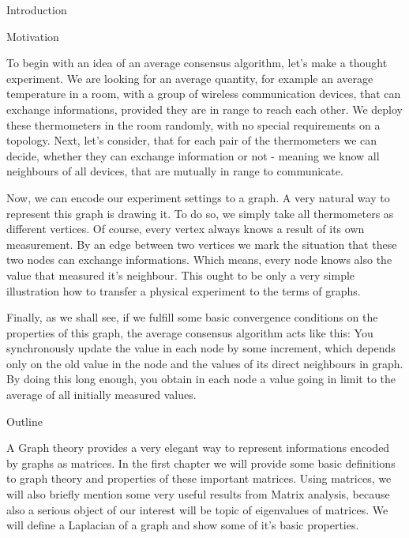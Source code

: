 

\def\ctustyle{{\tenss CTUstyle}}
\def\ttb{\tt\char`\\} %

\chap Introduction

\sec Motivation

To begin with an idea of an average consensus algorithm, let's make a thought experiment. We are looking for an average quantity, for example an average temperature in a room, with a group of wireless communication devices, that can exchange informations, provided they are in range to reach each other. We deploy these thermometers in the room randomly, with no special requirements on a topology. Next, let's consider, that for each pair of the thermometers we can decide, whether they can exchange information or not - meaning we know all neighbours of all devices, that are mutually in range to communicate. 

Now, we can encode our experiment settings to a graph. A very natural way to represent this graph is drawing it. To do so, we simply take all thermometers as different vertices. Of course, every vertex always knows a result of its own measurement. By an edge between two vertices we mark the situation that these two nodes can exchange informations. Which means, every node knows also the value that measured it's neighbour. This ought to be only a very simple illustration how to transfer a physical experiment to the terms of graphs.

 Finally, as we shall see, if we fulfill some basic convergence conditions on the properties of this graph, the average consensus algorithm acts like this: You synchronously update the value in each node by some increment, which depends only on the old value in the node and the values of its direct neighbours in graph. By doing this long enough, you obtain in each node a value going in limit to the average of  all initially measured values.

\sec Outline


 A Graph theory provides a very elegant way to represent informations encoded by graphs as matrices. In the first chapter we will provide some basic definitions to graph theory and properties of these important matrices. Using matrices, we will also briefly mention some very useful results from Matrix analysis, because also a serious object of our interest will be topic of eigenvalues of matrices. We will define a Laplacian of a graph and show some of it's basic properties.

